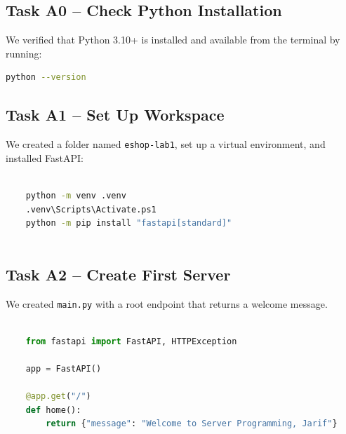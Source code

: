 \documentclass[12pt]{article}
\begin{document}
	\subsection{Task A0 -- Check Python Installation}
	
	We verified that Python 3.10+ is installed and available from the terminal by running:
	
	\begin{lstlisting}[language=bash, caption=Checking Python version, numbers=none, frame=single, framesep=10pt, xleftmargin=1.5em, aboveskip=1.5em, abovecaptionskip=1em]
	python --version
	\end{lstlisting}
	
	\subsection{Task A1 -- Set Up Workspace}
	
	We created a folder named \texttt{eshop-lab1}, set up a virtual environment, and installed FastAPI:
	
	\begin{lstlisting}[language=bash, caption=Setting up the workspace, numbers=none, frame=single, framesep=10pt, xleftmargin=1.5em, aboveskip=1.5em, abovecaptionskip=1em]
		
	python -m venv .venv
	.venv\Scripts\Activate.ps1
	python -m pip install "fastapi[standard]"
		
	\end{lstlisting}
	
	\vfill
	
	\subsection{Task A2 -- Create First Server}
	
	We created \texttt{main.py} with a root endpoint that returns a welcome message.
	
	\begin{lstlisting}[language=Python, caption=Task A2 -- First server endpoint, numbers=none, frame=single, framesep=10pt, xleftmargin=1.5em, aboveskip=1.5em, abovecaptionskip=1em]
		
	from fastapi import FastAPI, HTTPException
		
	app = FastAPI()
		
	@app.get("/")
	def home():
		return {"message": "Welcome to Server Programming, Jarif"}
		
	\end{lstlisting}
	
\end{document}
